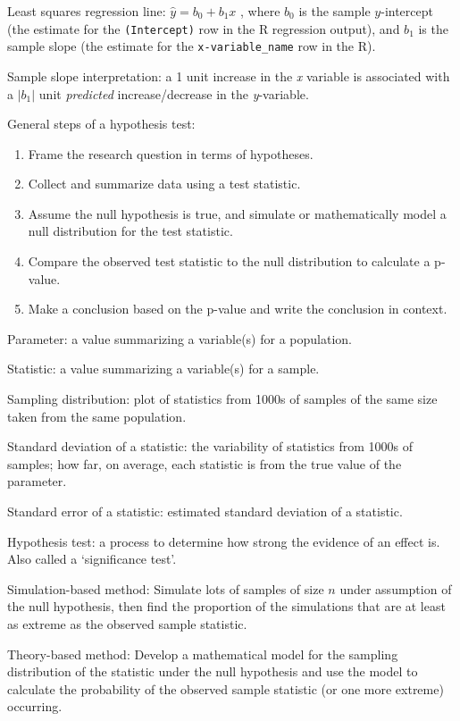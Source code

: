 \documentclass[
]{report}
\begin{document}

Least squares regression line: \(\hat{y} = b_0+b_1x\) , where \(b_0\) is the sample \(y\)-intercept (the estimate for the \texttt{(Intercept)} row in the R regression output), and \(b_1\) is the sample slope (the estimate for the \texttt{x-variable\_name} row in the R).

Sample slope interpretation: a 1 unit increase in the \emph{x} variable is associated with a \(|b_1 |\) unit \emph{predicted} increase/decrease in the \emph{y}-variable.

General steps of a hypothesis test:

\begin{enumerate}
\def\labelenumi{\arabic{enumi}.}
\item
  Frame the research question in terms of hypotheses.
\item
  Collect and summarize data using a test statistic.
\item
  Assume the null hypothesis is true, and simulate or mathematically model a null distribution for the test statistic.
\item
  Compare the observed test statistic to the null distribution to calculate a p-value.
\item
  Make a conclusion based on the p-value and write the conclusion in context.
\end{enumerate}

Parameter: a value summarizing a variable(s) for a population.

Statistic: a value summarizing a variable(s) for a sample.

Sampling distribution: plot of statistics from 1000s of samples of the same size taken from the same population.

Standard deviation of a statistic: the variability of statistics from 1000s of samples; how far, on average, each statistic is from the true value of the parameter.

Standard error of a statistic: estimated standard deviation of a statistic.

Hypothesis test: a process to determine how strong the evidence of an effect is. Also called a `significance test'.

Simulation-based method: Simulate lots of samples of size \(n\) under assumption of the null hypothesis, then find the proportion of the simulations that are at least as extreme as the observed sample statistic.

Theory-based method: Develop a mathematical model for the sampling distribution of the statistic under the null hypothesis and use the model to calculate the probability of the observed sample statistic (or one more extreme) occurring.
\end{document}

